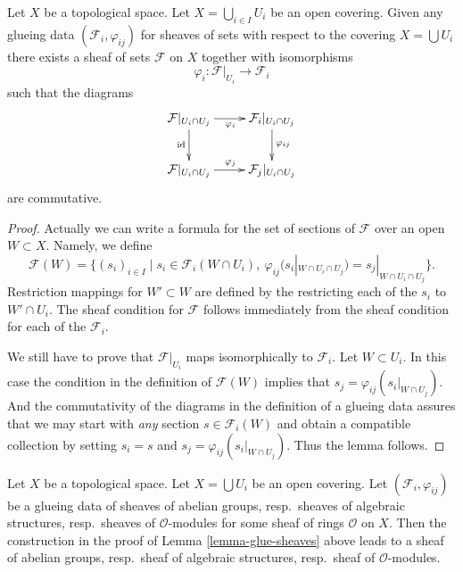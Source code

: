 \begin{lemma}
\label{lemma-glue-sheaves}
Let $X$ be a topological space.
Let $X = \bigcup_{i\in I} U_i$ be an open covering.
Given any glueing data $(\mathcal{F}_i, \varphi_{ij})$
for sheaves of sets with respect to the covering $X = \bigcup U_i$
there exists a sheaf of sets $\mathcal{F}$ on $X$
together with isomorphisms
$$
\varphi_i : \mathcal{F}|_{U_i} \to \mathcal{F}_i
$$
such that the diagrams
$$
\xymatrix{
\mathcal{F}|_{U_i \cap U_j} \ar[r]_{\varphi_i} \ar[d]_{\text{id}} &
\mathcal{F}_i|_{U_i \cap U_j} \ar[d]^{\varphi_{ij}} \\
\mathcal{F}|_{U_i \cap U_j} \ar[r]^{\varphi_j} &
\mathcal{F}_j|_{U_i \cap U_j}
}
$$
are commutative.
\end{lemma}

\begin{proof}
Actually we can write a formula for the set of sections
of $\mathcal{F}$ over an open $W \subset X$. Namely, we define
$$
\mathcal{F}(W) =
\{
(s_i)_{i \in I} \mid
s_i \in \mathcal{F}_i(W \cap U_i), \ 
\varphi_{ij}(s_i|_{W \cap U_i \cap U_j}) = s_j|_{W \cap U_i \cap U_j}
\}.
$$
Restriction mappings for $W' \subset W$ are defined by the restricting
each of the $s_i$ to $W' \cap U_i$. The sheaf condition for $\mathcal{F}$
follows immediately from the sheaf condition for each of the
$\mathcal{F}_i$.

\medskip\noindent
We still have to prove that $\mathcal{F}|_{U_i}$ maps
isomorphically to $\mathcal{F}_i$. Let $W \subset U_i$.
In this case the condition in the definition of
$\mathcal{F}(W)$ implies that $s_j = \varphi_{ij}(s_i|_{W \cap U_j})$.
And the commutativity of the diagrams in the definition
of a glueing data assures that we may start with {\it any}
section $s \in \mathcal{F}_i(W)$ and obtain a compatible
collection by setting $s_i = s$ and $s_j = \varphi_{ij}(s_i|_{W \cap U_j})$.
Thus the lemma follows.
\end{proof}

\begin{lemma}
\label{lemma-glue-sheaves-structures}
Let $X$ be a topological space.
Let $X = \bigcup U_i$ be an open covering.
Let $(\mathcal{F}_i, \varphi_{ij})$ be a glueing data
of sheaves of abelian groups, resp.\ sheaves of algebraic structures,
resp.\ sheaves of $\mathcal{O}$-modules for some sheaf of rings
$\mathcal{O}$ on $X$. Then the construction in the proof of
Lemma \ref{lemma-glue-sheaves} above leads to a sheaf
of abelian groups, resp.\ sheaf of algebraic structures,
resp.\ sheaf of $\mathcal{O}$-modules.
\end{lemma}

